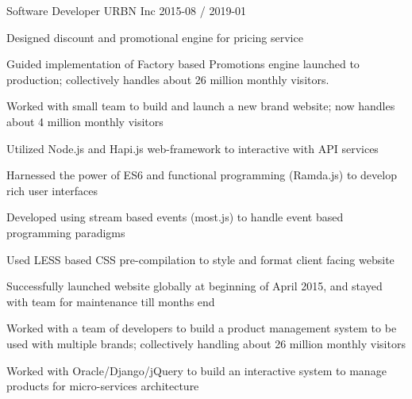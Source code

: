 \documentclass[11pt, a4paper]{awesomecv}
\begin{document}
\begin{cventries}
  \cventry
    {Software Developer}
    {URBN Inc}
    {}
    {2015-08 / 2019-01}
    {
          \begin{cvitems}
                    \item{Designed discount and promotional engine for pricing service}
                    \item{Guided implementation of Factory based Promotions engine launched to production; collectively handles about 26 million monthly visitors.}
                    \item{Worked with small team to build and launch a new brand website; now handles about 4 million monthly visitors}
                    \item{Utilized Node.js and Hapi.js web-framework to interactive with API services}
                    \item{Harnessed the power of ES6 and functional programming (Ramda.js) to develop rich user interfaces}
                    \item{Developed using stream based events (most.js) to handle event based programming paradigms}
                    \item{Used LESS based CSS pre-compilation to style and format client facing website}
                    \item{Successfully launched website globally at beginning of April 2015, and stayed with team for maintenance till month\textquotesingle s end}
                    \item{Worked with a team of developers to build a product management system to be used with multiple brands; collectively handling about 26 million monthly visitors}
                    \item{Worked with Oracle/Django/jQuery to build an interactive system to manage products for micro-services architecture}

\end{cvitems}}
\end{cventries}
\end{document}
